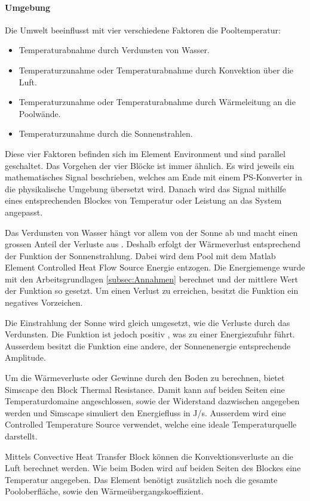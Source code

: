 \paragraph{Umgebung}
Die Umwelt beeinflusst mit vier verschiedene Faktoren die Pooltemperatur:
\begin{itemize}
	\item Temperaturabnahme durch Verdunsten von Wasser.
	\item Temperaturzunahme oder Temperaturabnahme durch Konvektion über die Luft.
	\item Temperaturzunahme oder Temperaturabnahme durch Wärmeleitung an die Poolwände.
	\item Temperaturzunahme durch die Sonnenstrahlen.
\end{itemize}
Diese vier Faktoren befinden sich im Element Environment und sind parallel geschaltet. Das Vorgehen der vier Blöcke ist immer ähnlich. Es wird jeweils ein mathematisches Signal beschrieben, welches am Ende mit einem PS-Konverter in die physikalische Umgebung übersetzt wird. Danach wird das Signal mithilfe eines entsprechenden Blockes von Temperatur oder Leistung an das System angepasst. 

Das Verdunsten von Wasser hängt vor allem von der Sonne ab und macht einen grossen Anteil der Verluste aus \cite{WasserVerdunsten}. Deshalb erfolgt der Wärmeverlust entsprechend der Funktion der Sonnenstrahlung. Dabei wird dem Pool mit dem Matlab Element Controlled Heat Flow Source Energie entzogen. Die Energiemenge wurde mit den Arbeitsgrundlagen \ref{subsec:Annahmen} berechnet und der mittlere Wert der Funktion so gesetzt. Um einen Verlust zu erreichen, besitzt die Funktion ein negatives Vorzeichen.

Die Einstrahlung der Sonne wird gleich umgesetzt, wie die Verluste durch das Verdunsten. Die Funktion ist jedoch positiv , was zu einer Energiezufuhr führt. Ausserdem besitzt die Funktion eine andere, der Sonnenenergie entsprechende Amplitude. 

Um die Wärmeverluste oder Gewinne durch den Boden zu berechnen, bietet Simscape den Block Thermal Resistance. Damit kann auf beiden Seiten eine Temperaturdomaine angeschlossen, sowie der Widerstand dazwischen angegeben werden und Simscape simuliert den Energiefluss in J/s. Ausserdem wird eine Controlled Temperature Source verwendet, welche eine ideale Temperaturquelle darstellt. 

Mittels Convective Heat Transfer Block können die Konvektionsverluste an die Luft berechnet werden. Wie beim Boden wird auf beiden Seiten des Blockes eine Temperatur angegeben. Das Element benötigt zusätzlich noch die gesamte Pooloberfläche, sowie den Wärmeübergangskoeffizient. 